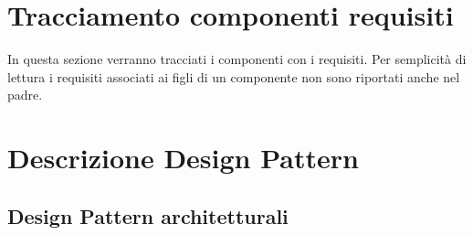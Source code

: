 \section{Tracciamento componenti requisiti}
In questa sezione verranno tracciati i componenti con i requisiti. Per semplicità di lettura i requisiti associati ai figli di un componente non sono riportati anche nel padre.


\newpage
\appendix
\section{Descrizione Design Pattern} %

\subsection{Design Pattern architetturali}
